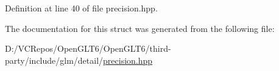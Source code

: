 Definition at line 40 of file precision.\+hpp.



The documentation for this struct was generated from the following file\+:\begin{DoxyCompactItemize}
\item 
D\+:/\+V\+C\+Repos/\+Open\+G\+L\+T6/\+Open\+G\+L\+T6/third-\/party/include/glm/detail/\mbox{\hyperlink{precision_8hpp}{precision.\+hpp}}\end{DoxyCompactItemize}
